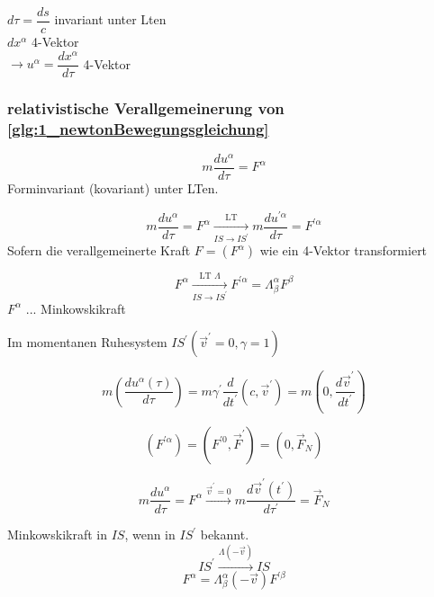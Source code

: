 \documentclass[a4paper, 11pt]{article}
\numberwithin{equation}{section}
\begin{document}
$d\tau = \dfrac{ds}{c}$ invariant unter Lten \\
$dx^\alpha$ 4-Vektor \\
$\rightarrow u^\alpha = \dfrac{dx^\alpha}{d\tau}$ 4-Vektor

\subsubsection*{relativistische Verallgemeinerung von \ref{glg:1_newtonBewegungsgleichung}}

\begin{equation}
m \dfrac{du^\alpha}{d\tau} = F^\alpha
\end{equation}
Forminvariant (kovariant) unter LTen.

\begin{equation}
m \dfrac{du^\alpha}{d\tau} = F^\alpha \xrightarrow[IS \rightarrow IS^\prime]{\text{LT}} m \dfrac{du^{\prime \alpha}}{d\tau} = F^{\prime \alpha}
\end{equation}
Sofern die verallgemeinerte Kraft $F = (F^\alpha)$ wie ein 4-Vektor transformiert

\begin{equation}
F^\alpha \xrightarrow[IS \rightarrow IS^\prime]{\text{LT } \Lambda} F^{\prime \alpha} = \Lambda^\alpha_\beta F^\beta
\end{equation}
$F^\alpha$ ... Minkowskikraft


Im momentanen Ruhesystem $IS^\prime (\vec{v}^\prime = 0, \gamma = 1)$

\begin{equation}
m \left( \dfrac{du^\alpha(\tau)}{d\tau} \right) = m \gamma^\prime \dfrac{d}{dt^\prime} (c,\vec{v}^\prime) = m \left( 0, \dfrac{d\vec{v}^\prime}{dt^\prime} \right) 
\end{equation}


\begin{equation}
\left(F^{\prime\alpha} \right) = \left(F^{\prime0}, \vec{F}^\prime \right) = \left( 0, \vec{F}_N \right)
\end{equation}

\begin{equation*}
m \dfrac{du^\alpha}{d\tau} = F^\alpha \xrightarrow{\vec{v}^\prime = 0} m \dfrac{d\vec{v}^\prime(t^\prime)}{d\tau^\prime} = \vec{F}_N
\end{equation*}

Minkowskikraft in $IS$, wenn in $IS^\prime$ bekannt.
\begin{equation*}
IS^\prime \xrightarrow{\Lambda(-\vec{v})} IS
\end{equation*}
\begin{equation}
F^\alpha = \Lambda^\alpha_\beta(-\vec{v}) F^{\prime \beta}
\end{equation}
\end{document}
